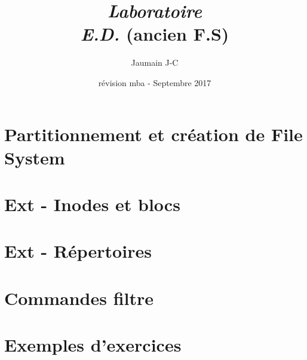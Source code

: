 \documentclass[french,10pt,A4]{report}
\begin{document}
\rfoot{\today}
\cfoot{ }
\renewcommand{\footrulewidth}{0.4pt}

\setlength{\parindent}{0pt} %

\lstset{frame=trBL}

\setcounter{tocdepth}{1}	%
\setcounter{secnumdepth}{5}	%

\newcommand{\titre}{Titre du sujet}	%

\thispagestyle{empty}

\title{\emph{Laboratoire\\\textbf{E.D. }}(ancien F.S)}
\author{Jaumain J-C}
\date{révision mba - Septembre 2017}
\maketitle
\tableofcontents
\newpage
%
\chapter{Partitionnement et création de File System}
\chapter{Ext - Inodes et blocs}
\chapter{Ext - Répertoires}
\chapter{Commandes filtre}
\chapter{Exemples d'exercices}
	
\end{document}
